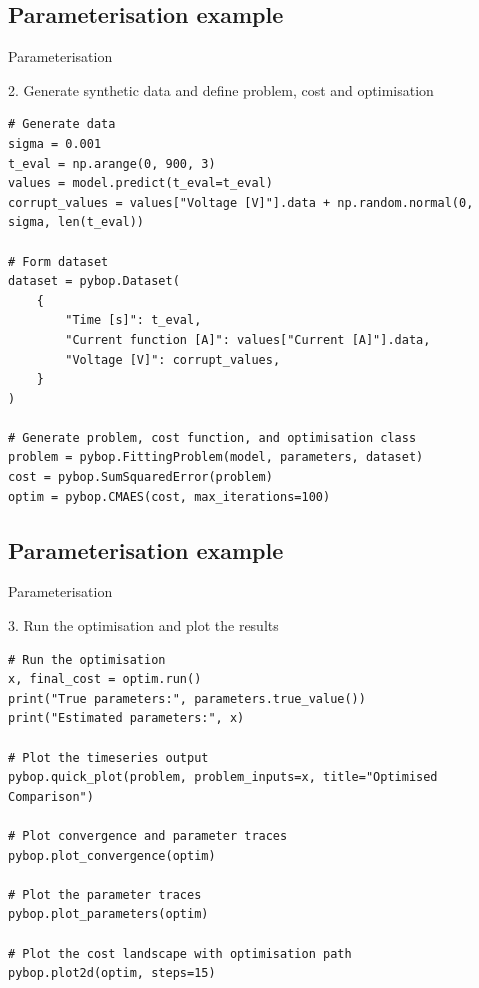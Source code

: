 \documentclass[aspectratio=169]{beamer}
\begin{document}
\subsection{Parameterisation example}
\begin{frame}[fragile,t]{Parameterisation}
    \vspace{-0.5cm}
    \begin{block}{2. Generate synthetic data and define problem, cost and optimisation}
    \begin{lstlisting}[firstnumber=1, xleftmargin=10pt]
# Generate data
sigma = 0.001
t_eval = np.arange(0, 900, 3)
values = model.predict(t_eval=t_eval)
corrupt_values = values["Voltage [V]"].data + np.random.normal(0, sigma, len(t_eval))

# Form dataset
dataset = pybop.Dataset(
    {
        "Time [s]": t_eval,
        "Current function [A]": values["Current [A]"].data,
        "Voltage [V]": corrupt_values,
    }
)

# Generate problem, cost function, and optimisation class
problem = pybop.FittingProblem(model, parameters, dataset)
cost = pybop.SumSquaredError(problem)
optim = pybop.CMAES(cost, max_iterations=100)
    \end{lstlisting}
    \end{block}
\end{frame}

\subsection{Parameterisation example}
\begin{frame}[fragile,t]{Parameterisation}
    \vspace{-1.5cm}
    \begin{block}{3. Run the optimisation and plot the results}
    \begin{lstlisting}[firstnumber=1, xleftmargin=10pt]
# Run the optimisation
x, final_cost = optim.run()
print("True parameters:", parameters.true_value())
print("Estimated parameters:", x)

# Plot the timeseries output
pybop.quick_plot(problem, problem_inputs=x, title="Optimised Comparison")

# Plot convergence and parameter traces
pybop.plot_convergence(optim)

# Plot the parameter traces
pybop.plot_parameters(optim)

# Plot the cost landscape with optimisation path
pybop.plot2d(optim, steps=15)
    \end{lstlisting}
    \end{block}
\end{frame}
\end{document}
